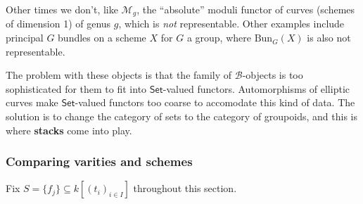 \begin{itemize}
\begin{itemize}
\begin{example}
                Other times we don't, like $\mathcal{M} _g$, the ``absolute'' moduli functor of curves (schemes of dimension 1) of genus $g$, which is \emph{not} representable. Other examples include principal $G$ bundles on a scheme $X$ for $G$ a group, where $\mathrm{Bun}_G(X)$ is also not representable. 

                The problem with these objects is that the family of $\mathcal{B} $-objects is too sophisticated for them to fit into $\mathsf{Set} $-valued functors. Automorphisms of elliptic curves make $\mathsf{Set} $-valued functors too coarse to accomodate this kind of data. The solution is to change the category of sets to the category of groupoids, and this is where \textbf{stacks} come into play.
            \end{example}
        \end{itemize}
\end{itemize}
\orbreak
\subsubsection*{Comparing varities and schemes}
Fix $S=\{f_j \}\subseteq k[(t_i ) _{i \in I}] $ throughout this section.


